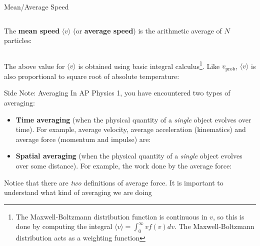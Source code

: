 \documentclass[12pt,aspectratio=169,dvipsnames]{beamer}
\begin{document}
\begin{frame}{Mean/Average Speed}
  \begin{columns}
    
    The \textbf{mean speed} $\langle v\rangle$ (or \textbf{average speed}) is
    the arithmetic average of $N$ particles:
    
  \end{columns}
  The above value for $\langle v\rangle$ is obtained using basic integral
  calculus\footnote{The Maxwell-Boltzmann distribution function is continuous
  in $v$, so this is done by computing the integral
  $\langle v\rangle=\int_0^\infty vf(v)dv$. The Maxwell-Boltzmann distribution
  acts as a weighting function}. Like $v_\text{prob}$, $\langle v\rangle$ is
  also proportional to square root of absolute temperature:
  
\end{frame}



\begin{frame}{Side Note: Averaging}
  In AP Physics 1,
  you have encountered two types of averaging:
  \begin{itemize}
  \item\textbf{Time averaging} (when the physical quantity of a
    \emph{single} object evolves over time). For example, average velocity,
    average acceleration (kinematics) and average force (momentum and impulse)
    are:


    \item\textbf{Spatial averaging} (when the physical quantity of a
      \emph{single} object evolves over some distance). For example, the work
      done by the average force:
      
  \end{itemize}
  Notice that there are \emph{two} definitions of average force. It is
  important to understand what kind of averaging we are doing
\end{frame}
\end{document}
